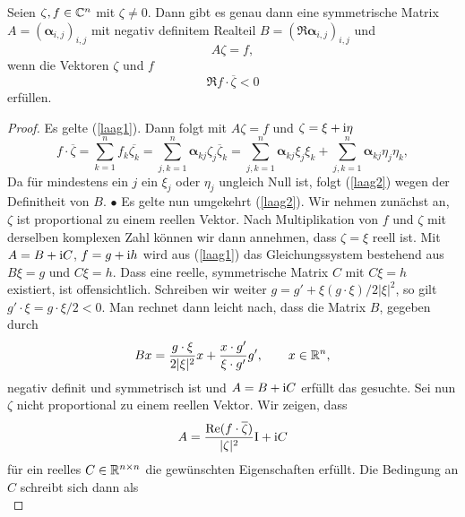 \begin{lem}\label{thm:4:lem3}
Seien $\zeta, f \in \mathbb C^n$ mit $\zeta \neq 0$. Dann gibt es genau dann eine symmetrische Matrix $A = (\boldsymbol\alpha_{i,j})_{i,j}$ mit negativ definitem Realteil
$B=(\Re\boldsymbol \alpha_{i,j})_{i,j}$ und
\begin{equation}\label{laag1}
   A \zeta = f,
\end{equation}
wenn die Vektoren $\zeta$ und $f$
\begin{equation} \label{laag2}
\Re f\cdot \overline \zeta < 0
\end{equation}
erfüllen.
\end{lem}
\begin{proof}
Es gelte (\ref{laag1}). Dann folgt mit $A\zeta =f$ und $\zeta=\xi+\mathrm i\eta$
\begin{equation}
 f\cdot \overline \zeta = \sum_{k=1}^{n}f_k \overline{\zeta_k} = \sum_{j,k=1}^{n} \boldsymbol\alpha_{kj} \zeta_j \overline \zeta_k
=  \sum_{j,k=1}^{n} \boldsymbol\alpha_{kj} \xi_j \xi_k +  \sum_{j,k=1}^{n} \boldsymbol\alpha_{kj} \eta_j \eta_k,
\end{equation}
Da für mindestens ein $j$ ein $\xi_j$ oder $\eta_j$ ungleich Null ist, folgt (\ref{laag2}) wegen der Definitheit von $B$. $\bullet$\qquad 
Es gelte nun umgekehrt (\ref{laag2}). Wir nehmen zunächst an, $\zeta$ ist proportional zu einem reellen Vektor. Nach Multiplikation von $f$ und $\zeta$ mit derselben komplexen Zahl können wir dann annehmen, dass $\zeta=\xi$ reell ist. Mit $A = B + \mathrm i C$, $f= g+\mathrm i h$ wird aus (\ref{laag1}) das Gleichungssystem bestehend aus $B \xi = g$ und $C \xi = h$. Dass eine reelle, symmetrische Matrix $C$ mit $C \xi = h$ existiert, ist offensichtlich. Schreiben wir weiter $g = g' + \xi (g\cdot \xi)/ 2 |\xi|^2$, so gilt $g'\cdot\xi = g\cdot\xi /2 < 0$. Man rechnet dann leicht nach, dass die Matrix $B$, gegeben durch
\begin{equation}
B x = \dfrac{g\cdot\xi }{2|\xi|^2} x + \dfrac{x\cdot g'}{\xi\cdot g'} g',\qquad x\in\mathbb R^n,
\end{equation}
negativ definit und symmetrisch ist und $A=B+\mathrm i C$ erfüllt das gesuchte. Sei nun $\zeta$ nicht proportional zu einem reellen Vektor. Wir zeigen, dass 
\begin{equation}
A = \dfrac{\operatorname{Re}( f\cdot\overline\zeta )}{|\zeta|^2} \mathrm I + \mathrm i C
\end{equation}
für ein reelles $C\in\mathbb R^{n\times n}$ die gewünschten Eigenschaften erfüllt. Die Bedingung an $C$ schreibt sich dann als
\begin{equation}

\end{equation}
\end{proof}
